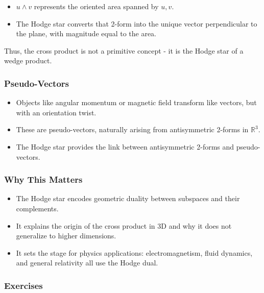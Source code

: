 \documentclass[
  letterpaper,
  DIV=11,
  numbers=noendperiod]{scrreprt}
\providecommand{\tightlist}{%
  \setlength{\itemsep}{0pt}\setlength{\parskip}{0pt}}
\begin{document}
\begin{itemize}
\tightlist
\item
  \(u \wedge v\) represents the oriented area spanned by \(u,v\).
\item
  The Hodge star converts that 2-form into the unique vector
  perpendicular to the plane, with magnitude equal to the area.
\end{itemize}

Thus, the cross product is not a primitive concept - it is the Hodge
star of a wedge product.

\subsubsection{Pseudo-Vectors}\label{pseudo-vectors}

\begin{itemize}
\tightlist
\item
  Objects like angular momentum or magnetic field transform like
  vectors, but with an orientation twist.
\item
  These are pseudo-vectors, naturally arising from antisymmetric 2-forms
  in \(\mathbb{R}^3\).
\item
  The Hodge star provides the link between antisymmetric 2-forms and
  pseudo-vectors.
\end{itemize}

\subsubsection{Why This Matters}\label{why-this-matters-21}

\begin{itemize}
\tightlist
\item
  The Hodge star encodes geometric duality between subspaces and their
  complements.
\item
  It explains the origin of the cross product in 3D and why it does not
  generalize to higher dimensions.
\item
  It sets the stage for physics applications: electromagnetism, fluid
  dynamics, and general relativity all use the Hodge dual.
\end{itemize}

\subsubsection{Exercises}\label{exercises-33}
\end{document}
